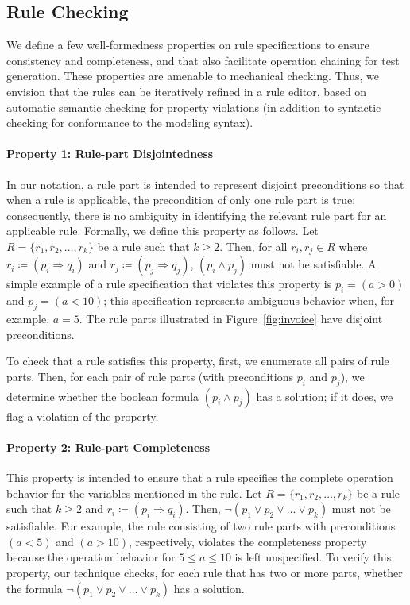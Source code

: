 \subsection{Rule Checking}
\label{sec:checking}
 
We define a few well-formedness properties on rule specifications to ensure
consistency and completeness, and that also facilitate operation chaining for
test generation. These properties are amenable to mechanical checking. Thus, we
envision that the rules can be iteratively refined in a rule editor, based on
automatic semantic checking for property violations (in addition to syntactic
checking for conformance to the modeling syntax).

\paragraph*{Property 1: Rule-part Disjointedness}
In our notation, a rule part is intended to represent disjoint preconditions so
that when a rule is applicable, the precondition of only one rule part is true;
consequently, there is no ambiguity in identifying the relevant rule part for an
applicable rule. Formally, we define this property as follows. Let $R= \{r_1,
r_2, \ldots, r_k\}$ be a rule such that $k \geq 2$. Then, for all $r_i, r_j \in
R$ where $ r_i \coloneqq (p_i \Longrightarrow q_i)$ and $r_j \coloneqq (p_j
\Longrightarrow q_j)$, $(p_i \wedge p_j)$ must not be satisfiable. A simple
example of a rule specification that violates this property is $p_i = (a > 0)$
and $p_j = (a < 10)$; this specification represents ambiguous behavior when, for
example, $a = 5$.  The rule parts illustrated in Figure~\ref{fig:invoice} have
disjoint preconditions.

To check that a rule satisfies this property, first, we enumerate all pairs of
rule parts. Then, for each pair of rule parts (with preconditions $p_i$ and
$p_j$), we determine whether the boolean formula $(p_i \wedge p_j)$ has a
solution; if it does, we flag a violation of the property.

\paragraph*{Property 2: Rule-part Completeness}
This property is intended to ensure that a rule specifies the complete operation
behavior for the variables mentioned in the rule. Let $R= \{r_1, r_2, \ldots,
r_k\}$ be a rule such that $k \geq 2$ and $r_i \coloneqq (p_i \Longrightarrow
q_i)$. Then, $\neg(p_1 \vee p_2 \vee \ldots \vee p_k)$ must not be
satisfiable. For example, the rule consisting of two rule parts with
preconditions $(a < 5)$ and $(a > 10)$, respectively, violates the completeness
property because the operation behavior for $5 \leq a \leq 10$ is left
unspecified.  To verify this property, our technique checks, for each rule that
has two or more parts, whether the formula $\neg(p_1 \vee p_2 \vee \ldots \vee
p_k)$ has a solution.

